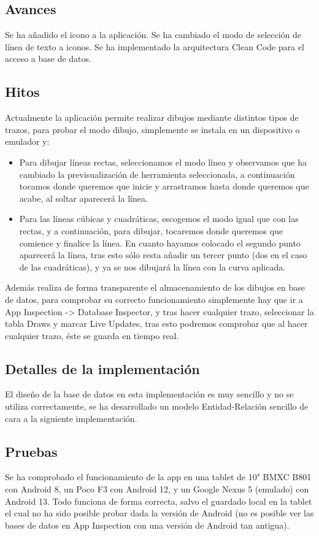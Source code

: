 \documentclass[a4paper,openright,12pt]{article}
\begin{document}

\subsection{Avances}
Se ha añadido el icono a la aplicación.
Se ha cambiado el modo de selección de línea de texto a iconos.
Se ha implementado la arquitectura Clean Code para el acceso a base de datos.


\subsection{Hitos}
Actualmente la aplicación permite realizar dibujos mediante distintos tipos de trazos, para probar el modo dibujo, simplemente se instala en un dispositivo o emulador y:
\begin{itemize}
    \item Para dibujar líneas rectas, seleccionamos el modo línea y observamos que ha cambiado la previsualización de herramienta seleccionada, a continuación tocamos donde queremos que inicie y arrastramos hasta donde queremos que acabe, al soltar aparecerá la línea.
    \item Para las líneas cúbicas y cuadráticas, escogemos el modo igual que con las rectas, y a continuación, para dibujar, tocaremos donde queremos que comience y finalice la línea. En cuanto hayamos colocado el segundo punto aparecerá la línea, tras esto sólo resta añadir un tercer punto (dos en el caso de las cuadráticas), y ya se nos dibujará la línea con la curva aplicada.
\end{itemize}
Además realiza de forma transparente el almacenamiento de los dibujos en base de datos, para comprobar su correcto funcionamiento simplemente hay que ir a App Inspection -> Database Inspector, y tras hacer cualquier trazo, seleccionar la tabla Draws y marcar Live Updates, tras esto podremos comprobar que al hacer cualquier trazo, éste se guarda en tiempo real.


\subsection{Detalles de la implementación}
El diseño de la base de datos en esta implementación es muy sencillo y no se utiliza correctamente, se ha desarrollado un modelo Entidad-Relación sencillo de cara a la siguiente implementación.


\subsection{Pruebas}
Se ha comprobado el funcionamiento de la app en una tablet de 10" BMXC B801 con Android 8, un Poco F3 con Android 12, y un Google Nexus 5 (emulado) con Android 13.
Todo funciona de forma correcta, salvo el guardado local en la tablet el cual no ha sido posible probar dada la versión de Android (no es posible ver las bases de datos en App Inspection con una versión de Android tan antigua).




\end{document}
